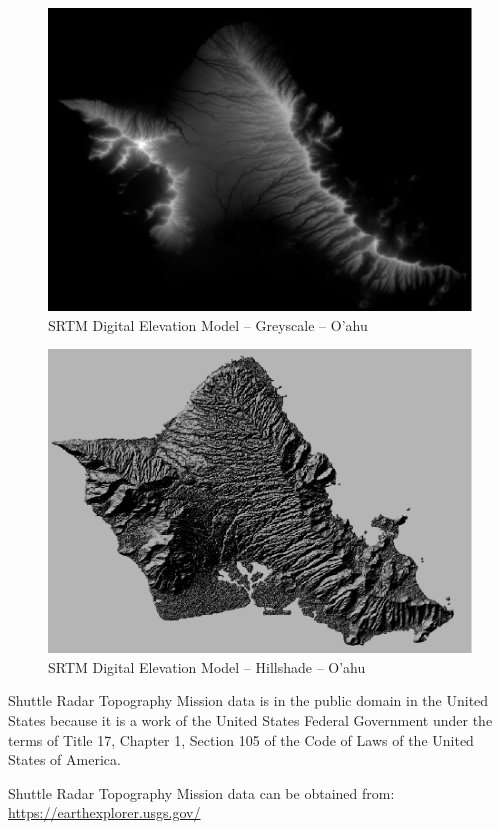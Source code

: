 \begin{figure}
  \centering
  \includegraphics[width=120mm]{eps/srtm_oahu.eps}
  \caption{SRTM Digital Elevation Model -- Greyscale -- O'ahu}
\end{figure}

\begin{figure}
  \centering
  \includegraphics[width=120mm]{eps/srtm_oahu_shaded.eps}
  \caption{SRTM Digital Elevation Model -- Hillshade -- O'ahu}
\end{figure}

Shuttle Radar Topography Mission data is in the public domain in the United States because it is a work of the United States Federal Government under the terms of Title 17, Chapter 1, Section 105 of the Code of Laws of the United States of America.

Shuttle Radar Topography Mission data can be obtained from:  \cite{Terrain-EarthExplorer} \\
\url{https://earthexplorer.usgs.gov/}

